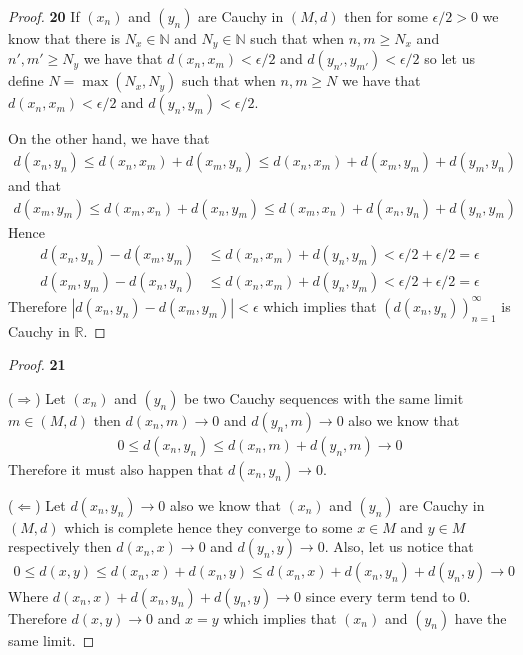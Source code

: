 \documentclass[11pt]{article}
\newcommand{\N}{\mathbb{N}}
\newcommand{\R}{\mathbb{R}}
\theoremstyle{definition}
\begin{document}
\cleardoublepage
	\begin{proof}{\textbf{20}}
        If $(x_n)$ and $(y_n)$ are Cauchy in $(M,d)$ then for some $\epsilon/2 > 0$
        we know that there is $N_x \in \N$ and $N_y \in \N$ such that when $n,m \geq N_x$
        and $n',m' \geq N_y$ we have that $d(x_n, x_m) < \epsilon/2$ and
        $d(y_{n'},y_{m'}) < \epsilon/2$ so let us define $N = \max(N_x, N_y)$
        such that when $n,m \geq N$ we have that $d(x_n, x_m) < \epsilon/2$
        and $d(y_n, y_m) < \epsilon/2$.
        
        On the other hand, we have that
        \begin{align*}
            d(x_n, y_n) \leq d(x_n, x_m) + d(x_m, y_n)
            \leq d(x_n, x_m) + d(x_m, y_m) + d(y_m, y_n) 
        \end{align*}
        and that
        \begin{align*}
            d(x_m, y_m) \leq d(x_m, x_n) + d(x_n, y_m)
            \leq d(x_m, x_n) + d(x_n, y_n) + d(y_n, y_m)
        \end{align*}
        Hence
        \begin{align*}
            d(x_n, y_n) -  d(x_m, y_m)
            &\leq d(x_n, x_m) + d(y_n, y_m) < \epsilon/2 + \epsilon/2 = \epsilon\\
            d(x_m, y_m) -  d(x_n, y_n)
            &\leq d(x_n, x_m) + d(y_n, y_m) < \epsilon/2 + \epsilon/2 = \epsilon
        \end{align*}
        Therefore $|d(x_n, y_n) -  d(x_m, y_m)| < \epsilon$ which implies that
        $(d(x_n,y_n))_{n=1}^\infty$ is Cauchy in $\R$. 
    \end{proof}
	\begin{proof}{\textbf{21}}

        ($\Rightarrow$) Let $(x_n)$ and $(y_n)$ be two Cauchy sequences with
        the same limit $m \in (M,d)$ then $d(x_n, m) \to 0$ and
        $d(y_n, m) \to 0$ also we know that
        \begin{align*}
            0 \leq d(x_n, y_n) \leq d(x_n,m) + d(y_n,m) \to 0
        \end{align*}
        Therefore it must also happen that $d(x_n,y_n) \to 0$.

        ($\Leftarrow$) Let $d(x_n, y_n) \to 0$  also we know that 
        $(x_n)$ and $(y_n)$ are Cauchy in $(M,d)$ which is complete hence they
        converge to some $x \in M$ and $y \in M$ respectively then
        $d(x_n,x) \to 0$ and $d(y_n,y) \to 0$.
        Also, let us notice that
        \begin{align*}
            0 \leq d(x,y) \leq d(x_n,x) + d(x_n, y)
            \leq  d(x_n,x) + d(x_n, y_n) + d(y_n,y) \to 0
        \end{align*}
        Where $d(x_n,x) + d(x_n, y_n) + d(y_n,y) \to 0$ since every term tend
        to 0. Therefore $d(x,y) \to 0$ and $x=y$ which implies that $(x_n)$
        and $(y_n)$ have the same limit.  
    \end{proof}
\end{document}
